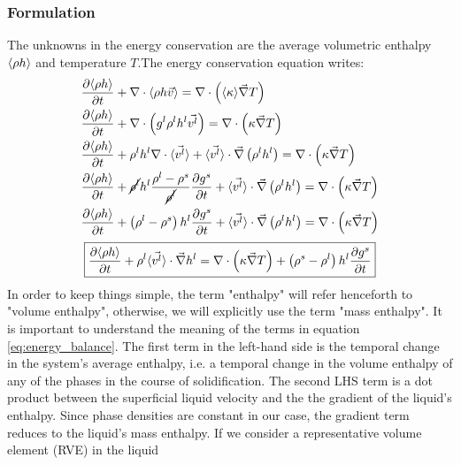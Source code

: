 \subsubsection{Formulation}
The unknowns in the energy conservation are the average volumetric enthalpy $\langle \rho h \rangle$ and temperature $T$.The energy conservation equation writes:
\begin{subequations}
\begin{align}
	& \frac{\partial \langle \rho h \rangle}{\partial t} + \nabla \cdot \langle \rho h \vec{v} \rangle 
	= \nabla  \cdot \left( \langle \kappa \rangle \vec{\nabla} T  \right) \\
	& \frac{\partial \langle \rho h \rangle}{\partial t} + \nabla \cdot \left( {g^l} \rho^l h^l \vec{v^l} \right)
	= \nabla  \cdot \left( \kappa \vec{\nabla} T  \right) \\ 
	& \frac{\partial \langle \rho h \rangle}{\partial t} 
		+ \rho^l h^l  \nabla \cdot \langle \vec{v^l} \rangle
		+ \langle \vec{v^l} \rangle \cdot \vec{\nabla} \left( \rho^l h^l \right)
		= \nabla  \cdot \left( \kappa \vec{\nabla} T  \right) \\   
	& \frac{\partial \langle \rho h \rangle}{\partial t} 
		+ \cancel{\rho^l} h^l  \frac{\rho^l-\rho^s}{\cancel{\rho^l}} \frac{\partial  {g^s} }{\partial t}
		+ \langle \vec{v^l} \rangle \cdot \vec{\nabla} \left( \rho^l h^l \right)
		= \nabla  \cdot \left( \kappa \vec{\nabla} T  \right) \\ 
	& \frac{\partial \langle \rho h \rangle}{\partial t} 
		+ \left( \rho^l-\rho^s \right) h^l \frac{\partial  {g^s} }{\partial t}
		+ \langle \vec{v^l} \rangle \cdot \vec{\nabla} \left( \rho^l h^l \right)
		= \nabla  \cdot \left( \kappa \vec{\nabla} T  \right)        
\end{align}
\end{subequations}
\begin{align}
\label{eq:energy_balance}
 \boxed{ \frac{\partial \langle \rho h \rangle}{\partial t} 
		+ \rho^l \langle \vec{v^l} \rangle \cdot \vec{\nabla} h^l
		= \nabla  \cdot \left( \kappa \vec{\nabla} T  \right)
		+ \left( \rho^s-\rho^l \right) h^l \frac{\partial  {g^s}}{\partial t}}
\end{align}
%
In order to keep things simple, the term "enthalpy" will refer henceforth to "volume enthalpy",
otherwise, we will explicitly use the term "mass enthalpy". It is important to understand the 
meaning of the terms in equation \eqref{eq:energy_balance}.
The first term in the left-hand side is the temporal change in the system's average enthalpy,
i.e. a temporal change in the volume enthalpy of any of the phases in the course of solidification.
The second LHS term is a dot product between the superficial liquid velocity and the the gradient
of the liquid's enthalpy. Since phase densities are constant in our case, the gradient term reduces
to the liquid's mass enthalpy. If we consider a representative volume element (RVE) in the liquid
